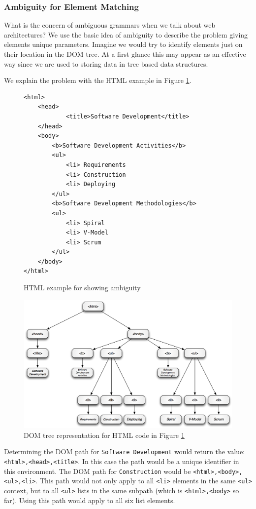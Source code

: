 \subsubsection{Ambiguity for Element Matching}

What is the concern of ambiguous grammars when we talk about web architectures? We use the basic idea of ambiguity to describe the problem giving elements unique parameters. Imagine we would try to identify elements just on their location in the DOM tree. At a first glance this may appear as an effective way since we are used to storing data in tree based data structures. 

We explain the problem with the HTML example in Figure \ref{dom-html-example}.

\begin{figure}
\begin{lstlisting}
<html>
	<head>
			<title>Software Development</title>
	</head>
	<body>
		<b>Software Development Activities</b>
		<ul>		
			<li> Requirements 
			<li> Construction 
			<li> Deploying		
		</ul>
		<b>Software Development Methodologies</b>
		<ul>		
			<li> Spiral
			<li> V-Model 
			<li> Scrum		
		</ul>
	</body>
</html>
\end{lstlisting}
\label{dom-html-example}
\caption{HTML example for showing ambiguity}
\end{figure}


\begin{figure}\centering
		\includegraphics[width=13cm]{images/dom-tree-example.png}
		\caption{DOM tree representation for HTML code in Figure \ref{dom-html-example}}
		\label{dom-tree-example}
\end{figure} 

Determining the DOM path for \verb^Software Development^ would return the value: \verb^<html>,<head>,<title>^. In this case the path would be a unique identifier in this environment. 
The DOM path for \verb^Construction^ would be \verb^<html>,<body>,<ul>,<li>^. This path would not only apply to all \verb^<li>^ elements in the same \verb^<ul>^ context, but to all \verb^<ul>^ lists in the same subpath (which is \verb^<html>,<body>^ so far). Using this path would apply to all six list elements. 

